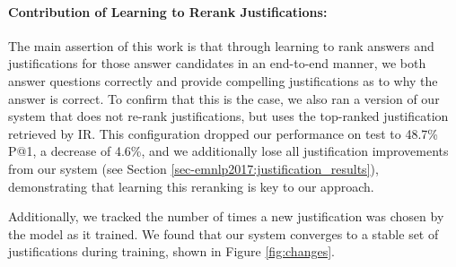 \paragraph{Contribution of Learning to Rerank Justifications:}
The main assertion of this work is that through learning to rank answers and justifications for those answer candidates in an end-to-end manner, we both answer questions correctly and provide compelling justifications as to why the answer is correct.  To confirm that this is the case, we also ran a version of our system that does not re-rank justifications, but uses the top-ranked justification retrieved by IR.  This configuration dropped our performance on test to 48.7\% P@1, a decrease of 4.6\%, and we additionally lose all justification improvements from our system (see Section \ref{sec-emnlp2017:justification_results}), demonstrating that learning this reranking is key to our approach.

Additionally, we tracked the number of times a new justification was chosen by the model as it trained. We found that our system converges to a stable set of justifications during training, shown in Figure \ref{fig:changes}.







